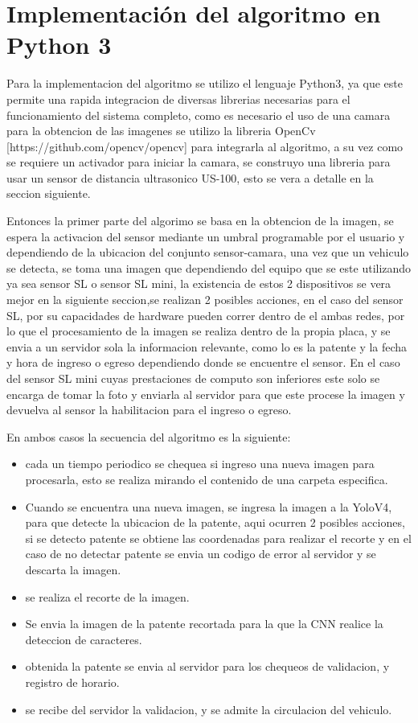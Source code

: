\section{Implementación del algoritmo en Python 3}

Para la implementacion del algoritmo se utilizo el lenguaje Python3, ya que este permite una rapida integracion de diversas librerias necesarias
para el funcionamiento del sistema completo, como es necesario el uso de una camara para la obtencion de las imagenes se utilizo la libreria 
OpenCv [https://github.com/opencv/opencv] para integrarla al algoritmo, a su vez como se requiere un activador para iniciar la camara, 
se construyo una libreria para usar un sensor de distancia ultrasonico US-100, esto se vera a detalle en la seccion siguiente.

Entonces la primer parte del algorimo se basa en la obtencion de la imagen, se espera la activacion del sensor mediante un umbral programable 
por el usuario y dependiendo de la ubicacion del conjunto sensor-camara, una vez que un vehiculo se detecta, se toma una imagen que dependiendo
del equipo que se este utilizando ya sea sensor SL o sensor SL mini, la existencia de estos 2 dispositivos se vera mejor en la siguiente 
seccion,se realizan 2 posibles acciones, en el caso del sensor SL, por su capacidades de hardware pueden correr dentro de el ambas redes, por lo
que el procesamiento de la imagen se realiza dentro de la propia placa, y se envia a un servidor sola la informacion relevante, como lo es la patente y 
la fecha y hora de ingreso o egreso dependiendo donde se encuentre el sensor. En el caso del sensor SL mini cuyas prestaciones de computo son 
inferiores este solo se encarga de tomar la foto y enviarla al servidor para que este procese la imagen y devuelva al sensor la habilitacion para el
ingreso o egreso.

En ambos casos la secuencia del algoritmo es la siguiente: 
\begin{itemize}
    \item cada un tiempo periodico se chequea si ingreso una nueva imagen para procesarla, esto se realiza mirando el contenido de una carpeta especifica.
    \item Cuando se encuentra una nueva imagen, se ingresa la imagen a la YoloV4, para que detecte la ubicacion de la patente, aqui ocurren 2 posibles acciones, si 
    se detecto patente se obtiene las coordenadas para realizar el recorte y en el caso de no detectar patente se envia un codigo de error al servidor y se descarta la imagen.
    \item se realiza el recorte de la imagen.
    \item Se envia la imagen de la patente recortada para la que la CNN realice la deteccion de caracteres.
    \item obtenida la patente se envia al servidor para los chequeos de validacion, y registro de horario.
    \item se recibe del servidor la validacion, y se admite la circulacion del vehiculo.
\end{itemize}




